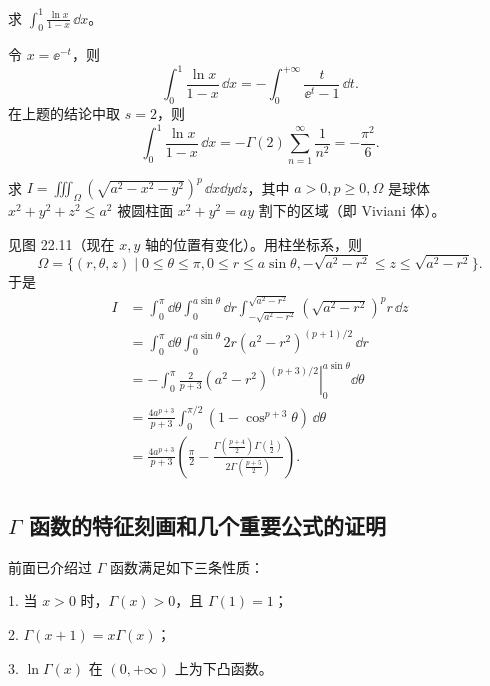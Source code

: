 \begin{xexample}[23.3.5]
求 $\displaystyle\int_0^1\frac{\ln x}{1-x}\,\dd x$。
\end{xexample}
\begin{xsolution}
令 $x=\ee^{-t}$，则
\[
  \int_0^1\frac{\ln x}{1-x}\,\dd x=-\int_0^{+\infty}\frac{t}{\ee^t-1}\,\dd t.
\]
在上题的结论中取 $s=2$，则
\[
  \int_0^1\frac{\ln x}{1-x}\,\dd x=-\Gamma(2)\sum_{n=1}^{\infty}\frac1{n^2}=-\frac{\pi^2}{6}.
\]
\end{xsolution}

\begin{xexample}[23.3.6]
求 $I=\displaystyle\iiint_\Omega(\sqrt{a^2-x^2-y^2})^p\,\dd x\dd y\dd z$，其中 $a>0,p\geqslant0,\Omega$ 是球体 $x^2+y^2+z^2\leqslant a^2$ 被圆柱面 $x^2+y^2=ay$ 割下的区域（即 Viviani 体）。
\end{xexample}
\begin{xsolution}
见图 22.11（现在 $x,y$ 轴的位置有变化）。用柱坐标系，则
\[
  \Omega=\{(r,\theta,z)\mid0\leqslant\theta\leqslant\pi,
  0\leqslant r\leqslant a\sin\theta,-\sqrt{a^2-r^2}\leqslant z\leqslant\sqrt{a^2-r^2}\}.
\]
于是
\[
\begin{aligned}
I&=\int_0^\pi\dd\theta\int_0^{a\sin\theta}\dd r
\int_{-\sqrt{a^2-r^2}}^{\sqrt{a^2-r^2}}(\sqrt{a^2-r^2})^p r\,\dd z\\
&=\int_0^\pi\dd\theta\int_0^{a\sin\theta}2r(a^2-r^2)^{(p+1)/2}\,\dd r\\
&=-\int_0^\pi\left.\frac2{p+3}(a^2-r^2)^{(p+3)/2}\right|_0^{a\sin\theta}\dd\theta\\
&=\frac{4a^{p+3}}{p+3}\int_0^{\pi/2}(1-\cos^{p+3}\theta)\,\dd\theta\\
&=\frac{4a^{p+3}}{p+3}\left(\frac\pi2-
\frac{\Gamma\left(\frac{p+4}{2}\right)\Gamma\left(\frac12\right)}{2\Gamma\left(\frac{p+5}{2}\right)}\right).
\end{aligned}
\]
\end{xsolution}

\subsection{\texorpdfstring{$\Gamma$ 函数的特征刻画和几个重要公式的证明}{Gamma 函数的特征刻画和几个重要公式的证明}}

前面已介绍过 $\Gamma$ 函数满足如下三条性质：

1. 当 $x>0$ 时，$\Gamma(x)>0$，且 $\Gamma(1)=1$；

2. $\Gamma(x+1)=x\Gamma(x)$；

3. $\ln\Gamma(x)$ 在 $(0,+\infty)$ 上为下凸函数。


